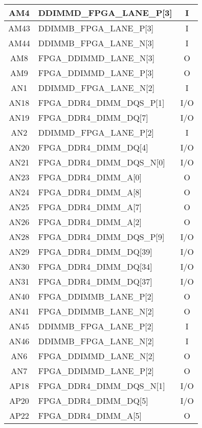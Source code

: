 \begin{longtable}[l]{| c | l | c |}
  AM4  & DDIMMD\_FPGA\_LANE\_P[3]     & I   \\ \hline
  AM43 & DDIMMB\_FPGA\_LANE\_P[3]     & I   \\ \hline
  AM44 & DDIMMB\_FPGA\_LANE\_N[3]     & I   \\ \hline
  AM8  & FPGA\_DDIMMD\_LANE\_N[3]     & O   \\ \hline
  AM9  & FPGA\_DDIMMD\_LANE\_P[3]     & O   \\ \hline
  AN1  & DDIMMD\_FPGA\_LANE\_N[2]     & I   \\ \hline
  AN18 & FPGA\_DDR4\_DIMM\_DQS\_P[1]  & I/O \\ \hline
  AN19 & FPGA\_DDR4\_DIMM\_DQ[7]      & I/O \\ \hline
  AN2  & DDIMMD\_FPGA\_LANE\_P[2]     & I   \\ \hline
  AN20 & FPGA\_DDR4\_DIMM\_DQ[4]      & I/O \\ \hline
  AN21 & FPGA\_DDR4\_DIMM\_DQS\_N[0]  & I/O \\ \hline
  AN23 & FPGA\_DDR4\_DIMM\_A[0]       & O   \\ \hline
  AN24 & FPGA\_DDR4\_DIMM\_A[8]       & O   \\ \hline
  AN25 & FPGA\_DDR4\_DIMM\_A[7]       & O   \\ \hline
  AN26 & FPGA\_DDR4\_DIMM\_A[2]       & O   \\ \hline
  AN28 & FPGA\_DDR4\_DIMM\_DQS\_P[9]  & I/O \\ \hline
  AN29 & FPGA\_DDR4\_DIMM\_DQ[39]     & I/O \\ \hline
  AN30 & FPGA\_DDR4\_DIMM\_DQ[34]     & I/O \\ \hline
  AN31 & FPGA\_DDR4\_DIMM\_DQ[37]     & I/O \\ \hline
  AN40 & FPGA\_DDIMMB\_LANE\_P[2]     & O   \\ \hline
  AN41 & FPGA\_DDIMMB\_LANE\_N[2]     & O   \\ \hline
  AN45 & DDIMMB\_FPGA\_LANE\_P[2]     & I   \\ \hline
  AN46 & DDIMMB\_FPGA\_LANE\_N[2]     & I   \\ \hline
  AN6  & FPGA\_DDIMMD\_LANE\_N[2]     & O   \\ \hline
  AN7  & FPGA\_DDIMMD\_LANE\_P[2]     & O   \\ \hline
  AP18 & FPGA\_DDR4\_DIMM\_DQS\_N[1]  & I/O \\ \hline
  AP20 & FPGA\_DDR4\_DIMM\_DQ[5]      & I/O \\ \hline
  AP22 & FPGA\_DDR4\_DIMM\_A[5]       & O   \\ \hline

\end{longtable}
